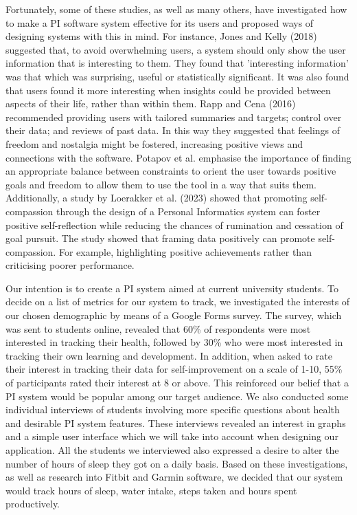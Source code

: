 \documentclass[12pt]{article}
\begin{document}
Fortunately, some of these studies, as well as many others, have investigated how to make a PI software system effective for its users and proposed ways of designing systems with this in mind. For instance, Jones and Kelly (2018) suggested that, to avoid overwhelming users, a system should only show the user information that is interesting to them. They found that 'interesting information' was that which was surprising, useful or statistically significant. It was also found that users found it more interesting when insights could be provided between aspects of their life, rather than within them. Rapp and Cena (2016) recommended providing users with tailored summaries and targets; control over their data; and reviews of past data. In this way they suggested that feelings of freedom and nostalgia might be fostered, increasing positive views and connections with the software. Potapov et al. emphasise the importance of finding an appropriate balance between constraints to orient the user towards positive goals and freedom to allow them to use the tool in a way that suits them. Additionally, a study by Loerakker et al. (2023) showed that promoting self-compassion through the design of a Personal Informatics system can foster positive self-reflection while reducing the chances of rumination and cessation of goal pursuit. The study showed that framing data positively can promote self-compassion. For example, highlighting positive achievements rather than criticising poorer performance.\par

Our intention is to create a PI system aimed at current university students. To  decide on a list of metrics for our system to track, we investigated the interests of our chosen demographic by means of a Google Forms survey. The survey, which was sent to students online, revealed that 60\% of respondents were most interested in tracking their health, followed by 30\% who were most interested in tracking their own learning and development. In addition, when asked to rate their interest in tracking their data for self-improvement on a scale of 1-10, 55\% of participants rated their interest at 8 or above. This reinforced our belief that a PI system would be popular among our target audience. We also conducted some individual interviews of students involving more specific questions about health and desirable PI system features. These interviews revealed an interest in graphs and a simple user interface which we will take into account when designing our application. All the students we interviewed also expressed a desire to alter the number of hours of sleep they got on a daily basis. Based on these investigations, as well as research into Fitbit and Garmin software, we decided that our system would track hours of sleep, water intake, steps taken and hours spent productively.\par
\end{document}
